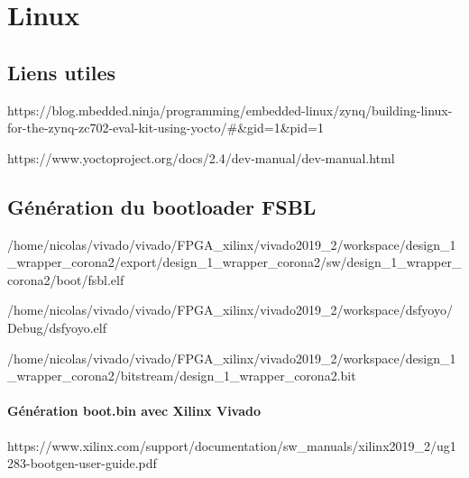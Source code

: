 \newpage

\chapter{Linux}



\section{Liens utiles}

https://blog.mbedded.ninja/programming/embedded-linux/zynq/building-linux-for-the-zynq-zc702-eval-kit-using-yocto/#&gid=1&pid=1

https://www.yoctoproject.org/docs/2.4/dev-manual/dev-manual.html

\section{Génération du bootloader FSBL}



/home/nicolas/vivado/vivado/FPGA_xilinx/vivado2019_2/workspace/design_1_wrapper_corona2/export/design_1_wrapper_corona2/sw/design_1_wrapper_corona2/boot/fsbl.elf

/home/nicolas/vivado/vivado/FPGA_xilinx/vivado2019_2/workspace/dsfyoyo/Debug/dsfyoyo.elf

/home/nicolas/vivado/vivado/FPGA_xilinx/vivado2019_2/workspace/design_1_wrapper_corona2/bitstream/design_1_wrapper_corona2.bit


\subsubsection{Génération boot.bin avec Xilinx Vivado}

https://www.xilinx.com/support/documentation/sw_manuals/xilinx2019_2/ug1283-bootgen-user-guide.pdf

\\

